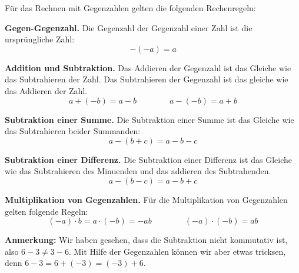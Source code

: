 Für das Rechnen mit Gegenzahlen gelten die folgenden Rechenregeln:
\begin{theorem}
  \textbf{Gegen-Gegenzahl.} Die Gegenzahl der Gegenzahl einer Zahl ist die ursprüngliche Zahl:
  \[
    -(-a) = a
  \]
\end{theorem}
\begin{theorem}
  \textbf{Addition und Subtraktion.} Das Addieren der Gegenzahl ist das Gleiche wie das Subtrahieren der Zahl. Das Subtrahieren der Gegenzahl ist das gleiche wie das Addieren der Zahl.
  \[
    a+(-b) = a-b \qquad\qquad a-(-b) = a+b
  \]
\end{theorem}
\begin{theorem}
  \textbf{Subtraktion einer Summe.} Die Subtraktion einer Summe ist das Gleiche wie das Subtrahieren beider Summanden:
  \[
    a-(b+c) = a-b-c
  \]
\end{theorem}
\begin{theorem}
  \textbf{Subtraktion einer Differenz.} Die Subtraktion einer Differenz ist das Gleiche wie das Subtrahieren des Minuenden und das addieren des Subtrahenden.
  \[
    a-(b-c) = a-b+c
  \]
\end{theorem}
\begin{theorem}
  \textbf{Multiplikation von Gegenzahlen.} Für die Multiplikation von Gegenzahlen gelten folgende Regeln:
  \[
    (-a)\cdot b = a\cdot(-b) = -ab \qquad\qquad  (-a)\cdot(-b) = ab
  \]
\end{theorem}

\textbf{Anmerkung:} Wir haben gesehen, dass die Subtraktion nicht kommutativ ist, also $6-3\ne 3-6$. Mit Hilfe der Gegenzahlen können wir aber etwas tricksen, denn $6-3 = 6+(-3) = (-3)+6$.
